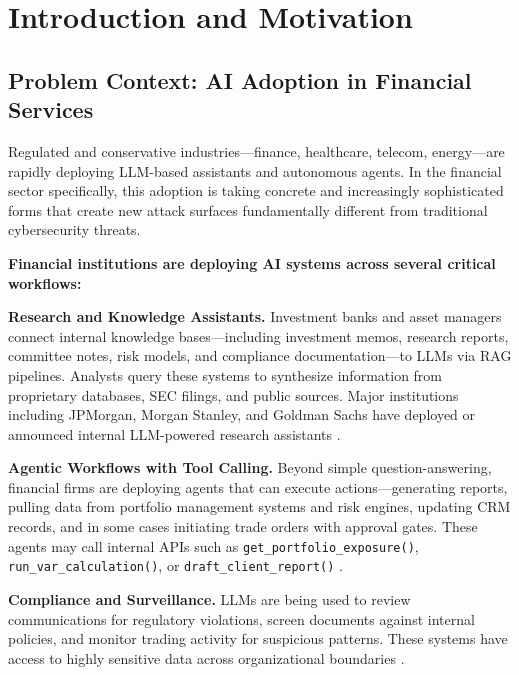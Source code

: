 \documentclass[12pt,a4paper]{article}
\begin{document}
\newpage
\tableofcontents
\newpage

\section{Introduction and Motivation}
\label{sec:intro}

\subsection{Problem Context: AI Adoption in Financial Services}

Regulated and conservative industries---finance, healthcare, telecom, energy---are rapidly deploying LLM-based assistants and autonomous agents. In the financial sector specifically, this adoption is taking concrete and increasingly sophisticated forms that create new attack surfaces fundamentally different from traditional cybersecurity threats.

\textbf{Financial institutions are deploying AI systems across several critical workflows:}

\textbf{Research and Knowledge Assistants.} Investment banks and asset managers connect internal knowledge bases---including investment memos, research reports, committee notes, risk models, and compliance documentation---to LLMs via RAG pipelines. Analysts query these systems to synthesize information from proprietary databases, SEC filings, and public sources. Major institutions including JPMorgan, Morgan Stanley, and Goldman Sachs have deployed or announced internal LLM-powered research assistants \cite{wsj_jpmorgan_ai, bloomberg_ms_ai, ft_gs_ai}.

\textbf{Agentic Workflows with Tool Calling.} Beyond simple question-answering, financial firms are deploying agents that can execute actions---generating reports, pulling data from portfolio management systems and risk engines, updating CRM records, and in some cases initiating trade orders with approval gates. These agents may call internal APIs such as \texttt{get\_portfolio\_exposure()}, \texttt{run\_var\_calculation()}, or \texttt{draft\_client\_report()} \cite{autogen, langchain_agents}.

\textbf{Compliance and Surveillance.} LLMs are being used to review communications for regulatory violations, screen documents against internal policies, and monitor trading activity for suspicious patterns. These systems have access to highly sensitive data across organizational boundaries \cite{nist_ai_rmf}.
\end{document}
